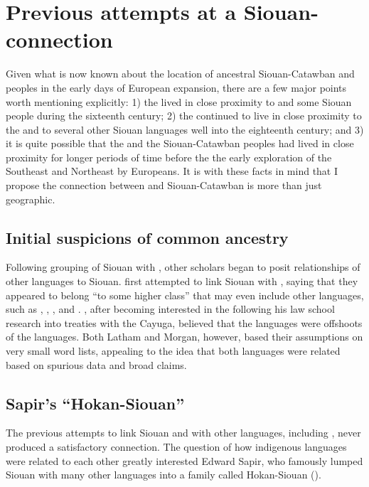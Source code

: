 \documentclass[output=paper]{LSP/langsci}
\begin{document}
\section{Previous attempts at a Siouan- connection}\label{sec:kasak:3}

Given what is now known about the location of ancestral Siouan-Catawban and  peoples in the early days of European expansion, there are a few major points worth mentioning explicitly: 1) the  lived in close proximity to  and some Siouan people during the sixteenth century; 2) the  continued to live in close proximity to the  and to several other Siouan languages well into the eighteenth century; and 3) it is quite possible that the  and the Siouan-Catawban peoples had lived in close proximity for longer periods of time before the the early exploration of the Southeast and Northeast by Europeans. It is with these facts in mind that I propose the connection between  and Siouan-Catawban is more than just geographic.

\subsection{Initial suspicions of common ancestry}

Following  grouping of Siouan with , other scholars began to posit relationships of other languages to Siouan. \citet{Latham1856} first attempted to link Siouan with , saying that they appeared to belong ``to some higher class'' that may even include other languages, such as , , , and . \citet{Morgan1871}, after becoming interested in the  following his law school research into treaties with the Cayuga, believed that the  languages were offshoots of the  languages. Both Latham and Morgan, however, based their assumptions on very small word lists, appealing to the idea that both languages were related based on spurious data and broad claims.

\subsection{Sapir's ``Hokan-Siouan''}

The previous attempts to link Siouan and  with other languages, including , never produced a satisfactory connection. The question of how indigenous languages were related to each other greatly interested Edward Sapir, who famously lumped Siouan with many other languages into a family called Hokan-Siouan (\citealt{Sapir1929}). 
\end{document}
